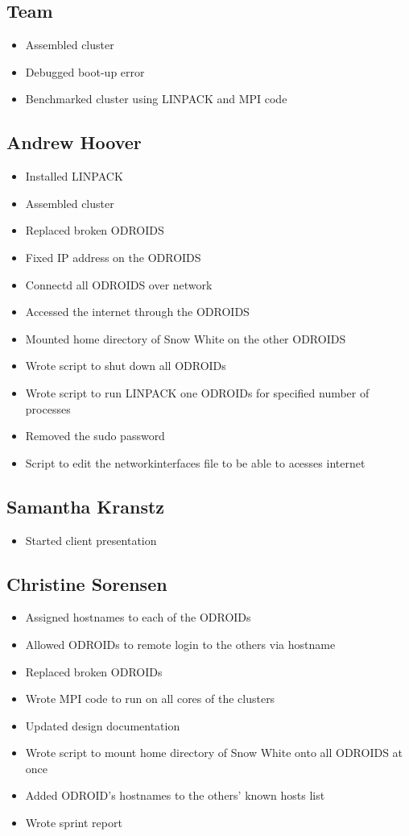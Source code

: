 \documentclass{article}
\begin{document}
\subsection*{Team}
\begin{itemize}
	\item Assembled cluster
	\item Debugged boot-up error
	\item Benchmarked cluster using LINPACK and MPI code
\end{itemize}

\subsection*{Andrew Hoover}
\begin{itemize}
	\item Installed LINPACK
	\item Assembled cluster
	\item Replaced broken ODROIDS
	\item Fixed IP address on the ODROIDS
	\item Connectd all ODROIDS over network
	\item Accessed the internet through the ODROIDS
	\item Mounted home directory of Snow White on the other ODROIDS
	\item Wrote script to shut down all ODROIDs
	\item Wrote script to run LINPACK one ODROIDs for specified number of processes
	\item Removed the sudo password
	\item Script to edit the networkinterfaces file to be able to acesses internet
\end{itemize}
\subsection*{Samantha Kranstz}
\begin{itemize}
	\item Started client presentation 
\end{itemize}
\subsection*{Christine Sorensen}
\begin{itemize}
	\item Assigned hostnames to each of the ODROIDs
	\item Allowed ODROIDs to remote login to the others via hostname
	\item Replaced broken ODROIDs
	\item Wrote MPI code to run on all cores of the clusters
	\item Updated design documentation
	\item Wrote script to mount home directory of Snow White onto all ODROIDS at once
	\item Added ODROID's hostnames to the others' known hosts list
	\item Wrote sprint report 
\end{itemize}
\end{document}
